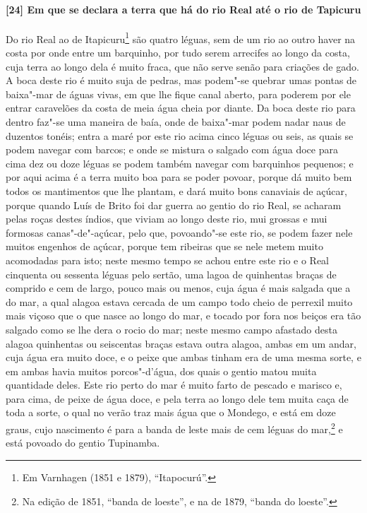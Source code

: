 \paragraph{[24] Em que se declara a terra que há do rio Real até o rio de Tapicuru} \quad
Do rio Real ao de Itapicuru\footnote{ Em Varnhagen (1851 e 1879), ``Itapocurú''.} são
quatro léguas, sem de um rio ao outro haver na costa por onde entre um barquinho, por tudo
serem arrecifes ao longo da costa, cuja terra ao longo dela é muito fraca, que não serve
senão para criações de gado. A boca deste rio é muito suja de pedras, mas podem"-se quebrar
umas pontas de baixa"-mar de águas vivas, em que lhe fique canal aberto, para poderem por
ele entrar caravelões da costa de meia água cheia por diante. Da boca deste rio para
dentro faz"-se uma maneira de baía, onde de baixa"-mar podem nadar naus de duzentos tonéis;
entra a maré por este rio acima cinco léguas ou seis, as quais se podem navegar com
barcos; e onde se mistura o salgado com água doce para cima dez ou doze léguas se podem
também navegar com barquinhos pequenos; e por aqui acima é a terra muito boa para se poder
povoar, porque dá muito bem todos os mantimentos que lhe plantam, e dará muito bons
canaviais de açúcar, porque quando Luís de Brito foi dar guerra ao gentio do rio Real, se
acharam pelas roças destes índios, que viviam ao longo deste rio, mui grossas e mui
formosas canas"-de"-açúcar, pelo que, povoando"-se este rio, se podem fazer nele muitos
engenhos de açúcar, porque tem ribeiras que se nele metem muito acomodadas para isto;
neste mesmo tempo se achou entre este rio e o Real cinquenta ou sessenta léguas pelo
sertão, uma lagoa de quinhentas braças de comprido e cem de largo, pouco mais ou menos,
cuja água é mais salgada que a do mar, a qual alagoa estava cercada de um campo todo cheio
de perrexil muito mais viçoso que o que nasce ao longo do mar, e tocado por fora nos
beiços era tão salgado como se lhe dera o rocio do mar; neste mesmo campo afastado desta
alagoa quinhentas ou seiscentas braças estava outra alagoa, ambas em um andar, cuja água
era muito doce, e o peixe que ambas tinham era de uma mesma sorte, e em ambas havia muitos
porcos"-d'água, dos quais o gentio matou muita quantidade deles. Este rio perto do mar é
muito farto de pescado e marisco e, para cima, de peixe de água doce, e pela terra ao
longo dele tem muita caça de toda a sorte, o qual no verão traz mais água que o Mondego, e
está em doze graus, cujo nascimento é para a banda de leste mais de cem léguas do
mar,\footnote{ Na edição de 1851, ``banda de loeste'', e na de 1879, ``banda do loeste''.}
e está povoado do gentio Tupinamba.

